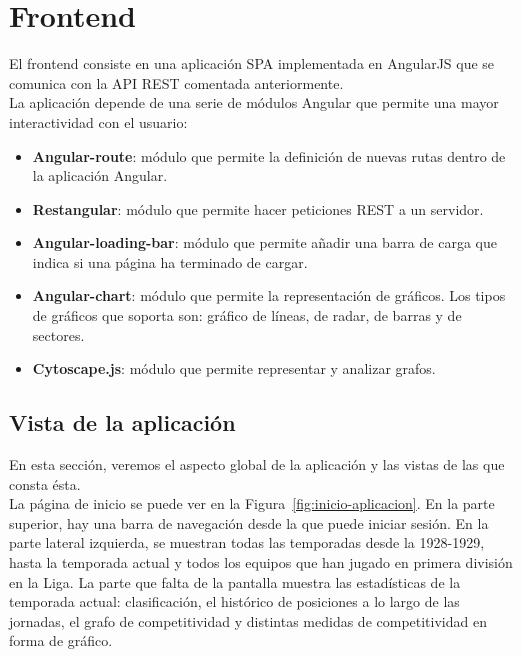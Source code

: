 \section{Frontend}

El frontend consiste en una aplicación SPA implementada en AngularJS que se comunica con la API REST comentada anteriormente.\\

La aplicación depende de una serie de módulos Angular que permite una mayor interactividad con el usuario:

\begin{itemize}
\item \textbf{Angular-route}: módulo que permite la definición de nuevas rutas dentro de la aplicación Angular.

\item \textbf{Restangular}: módulo que permite hacer peticiones REST a un servidor.

\item \textbf{Angular-loading-bar}: módulo que permite añadir una barra de carga que indica si una página ha terminado de cargar.

\item \textbf{Angular-chart}: módulo que permite la representación de gráficos. Los tipos de gráficos que soporta son: gráfico de líneas, de radar, de barras y de sectores.

\item \textbf{Cytoscape.js}: módulo que permite representar y analizar grafos.
\end{itemize}

\subsection{Vista de la aplicación}

En esta sección, veremos el aspecto global de la aplicación y las vistas de las que consta ésta.\\

La página de inicio se puede ver en la Figura~\ref{fig:inicio-aplicacion}. En la parte superior, hay una barra de navegación desde la que puede iniciar sesión. En la parte lateral izquierda, se muestran todas las temporadas desde la 1928-1929, hasta la temporada actual y todos los equipos que han jugado en primera división en la Liga. La parte que falta de la pantalla muestra las estadísticas de la temporada actual: clasificación, el histórico de posiciones a lo largo de las jornadas, el grafo de competitividad y distintas medidas de competitividad en forma de gráfico.\\


